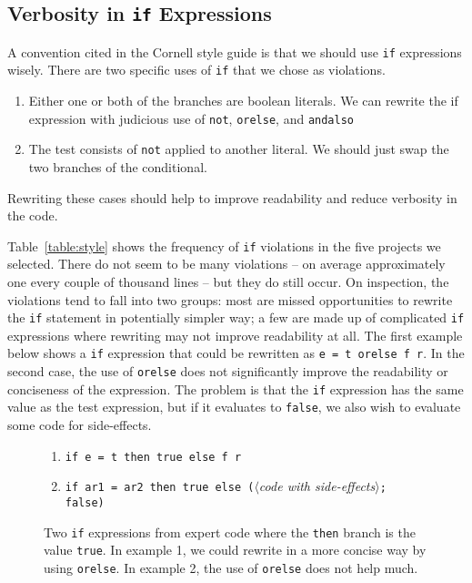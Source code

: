 \documentclass[12pt,abstracton]{scrartcl}
\begin{document}
\subsection{Verbosity in \texttt{if} Expressions}
A convention cited in the Cornell style guide is that we should use \texttt{if}
expressions wisely. There are two specific uses of \texttt{if} that we
chose as violations.
\begin{enumerate}
\item Either one or both of the branches are boolean literals. We can rewrite the if expression with judicious use of \texttt{not}, \texttt{orelse}, and \texttt{andalso}
\item The test consists of \texttt{not} applied to another literal. We should just swap the two branches of the conditional.
\end{enumerate}
Rewriting these cases should help to improve readability and reduce verbosity in the code.

Table~\ref{table:style} shows the frequency of \texttt{if} violations in the five projects we selected.
There do not seem to be many violations -- on average approximately one every couple of thousand lines --
but they do still occur.
On inspection, the violations tend to fall into two groups: most are
missed opportunities to rewrite the \texttt{if} statement in potentially simpler way; 
a few are made up of complicated \texttt{if} expressions where rewriting may not improve readability at all.
The first example below shows a \texttt{if} expression that could be rewritten as \texttt{e = t orelse f r}.
In the second case, the use of \texttt{orelse} does not significantly improve the readability or conciseness
of the expression. The problem is that the \texttt{if} expression has the same value as the test expression,
but if it evaluates to \texttt{false}, we also wish to evaluate some code for side-effects.

\begin{figure}[h!]
\begin{enumerate}
\item \texttt{if e = t then true else f r}
\item \texttt{if ar1 = ar2 then true else (}$\langle$\emph{code with side-effects}$\rangle$\texttt{; false)}
\end{enumerate}
\caption{Two \texttt{if} expressions from expert code where the \texttt{then} branch is the value \texttt{true}. In example 1, we could
rewrite in a more concise way by using \texttt{orelse}. In example 2, the use of \texttt{orelse} does not help much.}
\label{figure:ifthentrue}
\end{figure}
\end{document}
